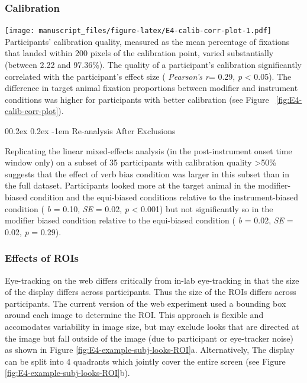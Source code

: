 \documentclass[
  man,floatsintext]{apa6}
\makeatletter
\let\oldparagraph\paragraph
\renewcommand{\paragraph}[1]{\oldparagraph{#1}\mbox{}}
\renewcommand{\paragraph}{\@startsection{paragraph}{4}{\parindent}%
  {0\baselineskip \@plus 0.2ex \@minus 0.2ex}%
  {-1em}%
  {\normalfont\normalsize\bfseries\itshape\typesectitle}}
\makeatother
\begin{document}
\subsubsection{Calibration}\label{calibration-4}

\texttt{[image: manuscript\_files/figure-latex/E4-calib-corr-plot-1.pdf]}
Participants' calibration quality, measured as the mean percentage of fixations that landed within 200 pixels of the calibration point, varied substantially (between 2.22 and 97.36\%).
The quality of a participant's calibration significantly correlated with the participant's effect size ( \emph{Pearson's r}= 0.29, \emph{p} \textless{} 0.05).
The difference in target animal fixation proportions between modifier and instrument conditions was higher for participants with better calibration (see Figure ~\ref{fig:E4-calib-corr-plot}).

\paragraph{Re-analysis After Exclusions}\label{re-analysis-after-exclusions-4}

Replicating the linear mixed-effects analysis (in the post-instrument onset time window only) on a subset of 35 participants with calibration quality \textgreater50\% suggests that the effect of verb bias condition was larger in this subset than in the full dataset. Participants looked more at the target animal in the modifier-biased condition and the equi-biased conditions relative to the instrument-biased condition ( \emph{b} = 0.10, \emph{SE} = 0.02, \emph{p} \textless{} 0.001) but not significantly so in the modifier biased condition relative to the equi-biased condition ( \emph{b} = 0.02, \emph{SE} = 0.02, \emph{p} = 0.29).

\subsubsection{Effects of ROIs}\label{effects-of-rois-1}

Eye-tracking on the web differs critically from in-lab eye-tracking in that the size of the display differs across participants. Thus the size of the ROIs differs across participants. The current version of the web experiment used a bounding box around each image to determine the ROI.
This approach is flexible and accomodates variability in image size, but may exclude looks that are directed at the image but fall outside of the image (due to participant or eye-tracker noise) as shown in Figure \ref{fig:E4-example-subj-looks-ROI}a. Alternatively, The display can be split into 4 quadrants which jointly cover the entire screen (see Figure \ref{fig:E4-example-subj-looks-ROI}b).
\end{document}

